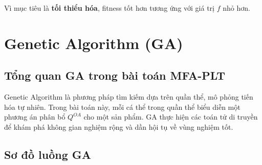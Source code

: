 \documentclass[12pt]{article}
\newcommand{\QOA}{Q^{OA}}
\begin{document}
Vì mục tiêu là \textbf{tối thiểu hóa}, fitness tốt hơn tương ứng với giá trị $f$ nhỏ hơn.



\section{Genetic Algorithm (GA)}

\subsection{Tổng quan GA trong bài toán MFA-PLT}

Genetic Algorithm là phương pháp tìm kiếm dựa trên quần thể, mô phỏng tiến hóa tự nhiên. Trong bài toán này, mỗi cá thể trong quần thể biểu diễn một phương án phân bổ $\QOA$ cho một sản phẩm. GA thực hiện các toán tử di truyền để khám phá không gian nghiệm rộng và dần hội tụ về vùng nghiệm tốt.

\subsection{Sơ đồ luồng GA}
\end{document}
